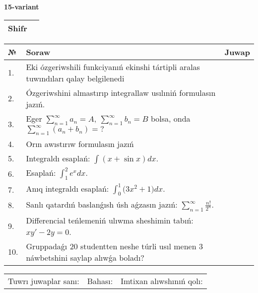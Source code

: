 \documentclass{article}
\begin{document}
  \egroup
  
  \newpage
  
  
  \textbf{15-variant}\\
  
  \bgroup
  \def\arraystretch{1.6} %
  
  \begin{tabular}{|m{5.7cm}|m{9.5cm}|}
  \hline
  Shifr & \\
  \hline
  \end{tabular}
  
  \vspace{1cm}
  
  \begin{tabular}{|m{0.7cm}|m{10cm}|m{4cm}|}
  \hline
  № & Soraw & Juwap \\
  \hline
  1. & Eki ózgeriwshili funkciyanıń ekinshi tártipli aralas tuwındıları qalay belgilenedi &  \\
  \hline
  2. & Ózgeriwshini almastırıp integrallaw usılıniń formulasın jazıń. &  \\
  \hline
  3. & Eger \(\sum_{n = 1}^{\infty}a_{n} = A,\ \sum_{n = 1}^{\infty}b_{n} = B\) bolsa, onda \(\sum_{n = 1}^{\infty}\left( a_{n} + b_{n} \right) = ?\) &  \\
  \hline
  4. & Orın awıstırıw formulasın jazıń &  \\
  \hline
  5. & Integraldı esaplań: \(\int{(x + \sin x)dx}\). &  \\
  \hline
  6. & Esaplań: \(\int_{1}^2 {e^{x}dx}\). &  \\
  \hline
  7. & Anıq integraldı esaplań: \(\int_{0}^{1}{(3x^2 } + 1)dx\). &  \\
  \hline
  8. & Sanlı qatardıń baslanǵısh úsh aǵzasın jazıń: \(\sum_{n = 1}^{\infty}\frac{n!}{2^{n}}\). &  \\
  \hline
  9. & Differencial teńlemeniń ulıwma sheshimin tabıń: \(xy' - 2y = 0\). &  \\
  \hline
  10. & Gruppadaǵı 20 studentten neshe túrli usıl menen 3 náwbetshini saylap alıwǵa boladı? &  \\
  \hline
  \end{tabular}
  
  \vspace{1cm}
  
  \begin{tabular}{lll}
  Tuwrı juwaplar sanı: \underline{\hspace{1.5cm}} & 
  Bahası: \underline{\hspace{1.5cm}} & 
  Imtixan alıwshınıń qolı: \underline{\hspace{2cm}} \\
  \end{tabular}
  
\end{document}
